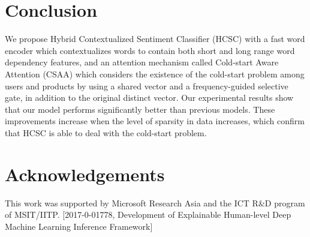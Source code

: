 \documentclass[11pt,a4paper]{article}
\begin{document}
\section{Conclusion}

We propose Hybrid Contextualized Sentiment Classifier (HCSC) with a fast word encoder which contextualizes words to contain both short and long range word dependency features, and an attention mechanism called Cold-start Aware Attention (CSAA) which considers the existence of the cold-start problem among users and products by using a shared vector and a frequency-guided selective gate, in addition to the original distinct vector. Our experimental results show that our model performs significantly better than previous models. These improvements increase when the level of sparsity in data increases, which confirm that HCSC is able to deal with the cold-start problem.

\section*{Acknowledgements}

This work was supported by Microsoft Research Asia and the ICT R\&D program of MSIT/IITP.
[2017-0-01778, Development of Explainable Human-level Deep Machine Learning Inference Framework]



\end{document}
